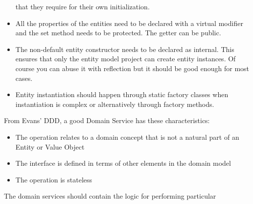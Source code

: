 \documentclass{article}
\begin{document}
\begin{itemize}
     that they require for their own initialization.
   \item All the properties of the entities need to be declared with a
     virtual modifier and the set method needs to be protected. The
     getter can be public.
   \item The non-default entity constructor needs to be declared as
     internal. This ensures that only the entity model project can
     create entity instances. Of course you can abuse it with
     reflection but it should be good enough for most cases.
   \item Entity instantiation should happen through static factory
     classes when instantiation is complex or alternatively through
     factory methods.

\end{itemize}

From Evans' DDD, a good Domain Service has these characteristics:
\begin{itemize}
  \item The operation relates to a domain concept that is not a
    natural part of an Entity or Value Object
  \item The interface is defined in terms of other elements in the
    domain model
  \item The operation is stateless
\end{itemize}

The domain services should contain the logic for performing particular
\end{document}
